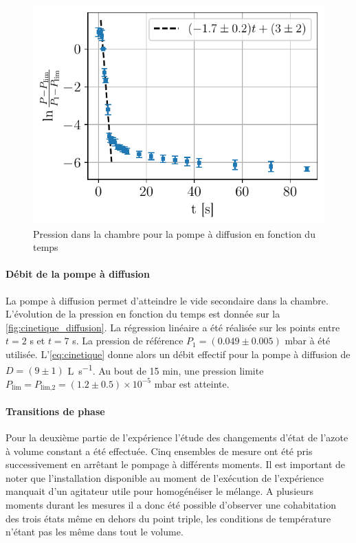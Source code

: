 \begin{minipage}{\textwidth}
    \begin{figure}
        \centering
        \includegraphics[width=\linewidth]{figures/cinetique_diffusion.pdf}
        \caption{Pression dans la chambre pour la pompe à diffusion en fonction du temps}
        \label{fig:cinetique_diffusion}
    \end{figure}
    
    \paragraph*{Débit de la pompe à diffusion}
    La pompe à diffusion permet d'atteindre le vide secondaire dans la chambre. L'évolution de la pression en fonction du temps est donnée sur la \autoref{fig:cinetique_diffusion}. La régression linéaire a été réalisée sur les points entre \(t = 2\) \si{\second} et \(t = 7\) \si{\second}. La pression de référence \(P_1 = (0.049 \pm 0.005)\) \si{\milli\bar} à été utilisée. L'\autoref{eq:cinetique} donne alors un débit effectif pour la pompe à diffusion de \(D = (9 \pm 1)\) \si{\liter \per \second}. Au bout de 15 \si{\minute}, une pression limite \(P_\textrm{lim} = P_\textrm{lim,2} = (1.2 \pm 0.5) \times 10^{-5}\) \si{\milli\bar} est atteinte.

    \paragraph{Transitions de phase}
    Pour la deuxième partie de l'expérience l'étude des changements d'état de l'azote à volume constant a été effectuée. Cinq ensembles de mesure ont été pris successivement en arrêtant le pompage à différents moments. Il est important de noter que l'installation disponible au moment de l'exécution de l'expérience manquait d'un agitateur utile pour homogénéiser le mélange. A plusieurs moments durant les mesures il a donc été possible d'observer une cohabitation des trois états même en dehors du point triple, les conditions de température n'étant pas les même dans tout le volume.
\end{minipage}

